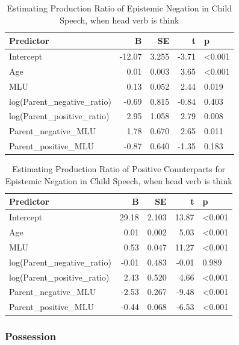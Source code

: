 \documentclass[
  english,
  man,floatsintext]{apa6}
\begin{document}
\begin{table}

\caption{\label{tab:unnamed-chunk-9}Estimating Production Ratio of Epistemic Negation in Child Speech, when head verb is think}
\centering
\begin{tabular}[t]{l|r|r|r|l}
\hline
Predictor & B & SE & t & p\\
\hline
Intercept & -12.07 & 3.255 & -3.71 & <0.001\\
\hline
Age & 0.01 & 0.003 & 3.65 & <0.001\\
\hline
MLU & 0.13 & 0.052 & 2.44 & 0.019\\
\hline
log(Parent\_negative\_ratio) & -0.69 & 0.815 & -0.84 & 0.403\\
\hline
log(Parent\_positive\_ratio) & 2.95 & 1.058 & 2.79 & 0.008\\
\hline
Parent\_negative\_MLU & 1.78 & 0.670 & 2.65 & 0.011\\
\hline
Parent\_positive\_MLU & -0.87 & 0.640 & -1.35 & 0.183\\
\hline
\end{tabular}
\end{table}

\begin{table}

\caption{\label{tab:unnamed-chunk-9}Estimating Production Ratio of Positive Counterparts for Epistemic Negation in Child Speech, when head verb is think}
\centering
\begin{tabular}[t]{l|r|r|r|l}
\hline
Predictor & B & SE & t & p\\
\hline
Intercept & 29.18 & 2.103 & 13.87 & <0.001\\
\hline
Age & 0.01 & 0.002 & 5.03 & <0.001\\
\hline
MLU & 0.53 & 0.047 & 11.27 & <0.001\\
\hline
log(Parent\_negative\_ratio) & -0.01 & 0.483 & -0.01 & 0.989\\
\hline
log(Parent\_positive\_ratio) & 2.43 & 0.520 & 4.66 & <0.001\\
\hline
Parent\_negative\_MLU & -2.53 & 0.267 & -9.48 & <0.001\\
\hline
Parent\_positive\_MLU & -0.44 & 0.068 & -6.53 & <0.001\\
\hline
\end{tabular}
\end{table}

\clearpage

\hypertarget{possession}{%
\subsubsection{Possession}\label{possession}}
\end{document}
